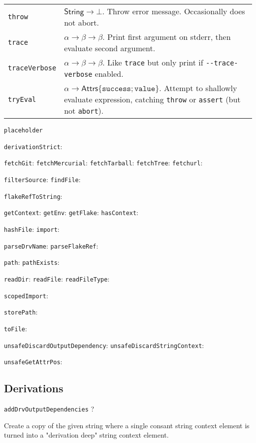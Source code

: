 \documentclass[9pt, a4paper, landscape]{extarticle}
\newcommand{\cmd}[1]{\texttt{#1}}
\newcommand{\str}{\textsf{String}}
\newcommand{\ats}{\textsf{Attrs}}
\begin{document}
\begin{multicols*}{3}
\begin{tabularx}{\columnwidth}{@{}l>{\raggedright\arraybackslash}X@{}}
  \cmd{throw} & $\str\to\bot$. Throw error message. Occasionally does not
  abort. \\

  \cmd{trace} & $\alpha\to\beta\to\beta$. Print first argument on stderr, then evaluate
  second argument. \\

  \cmd{traceVerbose} &  $\alpha\to\beta\to\beta$. Like \cmd{trace} but only print if
  \cmd{{-}{-}trace-verbose} enabled. \\

  \cmd{tryEval} & $\alpha\to\ats\{\cmd{success}; \cmd{value}\}$. Attempt to
  shallowly evaluate expression, catching \cmd{throw} or \cmd{assert}
  (but not \cmd{abort}). 
\end{tabularx}


\cmd{placeholder} 

\cmd{derivationStrict}:

\cmd{fetchGit}:
\cmd{fetchMercurial}:
\cmd{fetchTarball}:
\cmd{fetchTree}:
\cmd{fetchurl}:

\cmd{filterSource}:
\cmd{findFile}:

\cmd{flakeRefToString}:

\cmd{getContext}:
\cmd{getEnv}:
\cmd{getFlake}:
\cmd{hasContext}:

\cmd{hashFile}:
\cmd{import}:

\cmd{parseDrvName}:
\cmd{parseFlakeRef}:


\cmd{path}:
\cmd{pathExists}:

\cmd{readDir}:
\cmd{readFile}:
\cmd{readFileType}:

\cmd{scopedImport}:



\cmd{storePath}:

\cmd{toFile}:



\cmd{unsafeDiscardOutputDependency}:
\cmd{unsafeDiscardStringContext}:

\cmd{unsafeGetAttrPos}:


\subsection*{Derivations}

  \cmd{addDrvOutputDependencies} ?

    Create a copy of the given string where a single consant string context element is turned into a "derivation deep" string context element.


\end{multicols*}
\end{document}
